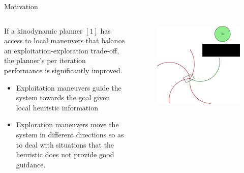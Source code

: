 \begin{columns}[t]
	\begin{column}{0.50\textwidth}
		\begin{block}{\large Motivation}
		    \begin{columns}[t]
			    \begin{column}{0.62\textwidth}
					    If a kinodynamic planner $[1]$ has access to local maneuvers that balance an exploitation-exploration trade-off, the planner's per iteration performance is significantly improved.
					    \begin{itemize}
					    	\item Exploitation maneuvers guide the system towards the goal given local heuristic information
					    	\item Exploration maneuvers move the system in different directions so as to deal with situations that the heuristic does not provide good guidance.
					    \end{itemize}
			    \end{column}
			    \begin{column}{0.35\textwidth}
			    	\centering
					\begin{figure}
					\includegraphics[scale=0.67]{figures/maneuver_sets.eps}

\end{figure}
\end{column}
\end{columns}
\end{block}
\end{column}
\end{columns}
